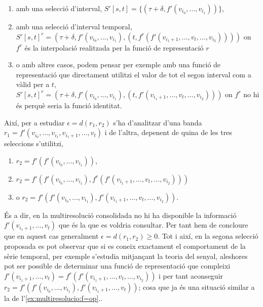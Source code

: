   \begin{enumerate}
  \item amb una selecció d'interval,  $S'[s,t]=\{ (\tau+\delta,
    f'(v_{i_0},\dotsc,v_{i_1}) ) \}$,

  \item amb una selecció d'interval temporal,
    $S'[s,t]^r=(\tau+\delta, f'(v_{i_0},\dotsc,v_{i_1}), (t,
    f^r(f'(v_{i_1+1},\dotsc,v_{t} ,\dotsc,v_{i_2}))) ) $ on $f^r$ és
    la interpolació realitzada per la funció de representació $r$

  \item o amb altres casos, podem pensar per exemple amb una funció de
    representació que directament utilitzi el valor de tot el segon
    interval com a vàlid per a $t$, $S'[s,t]^r=(\tau+\delta,
    f'(v_{i_0},\dotsc,v_{i_1}), (t, f'(v_{i_1+1},\dotsc,v_{t}
    ,\dotsc,v_{i_2})) )$ on $f^r$ no hi és perquè seria la funció identitat.
   \end{enumerate}



   Així, per a estudiar $\epsilon=d(r_1,r_2)$ s'ha d'analitzar d'una
   banda $r_1=f'(v_{i_0},\dotsc,v_{i_1},v_{i_1+1},\dotsc,v_{t})$ i de l'altra, depenent de quina de les
   tres seleccions s'utilitzi,
   \begin{enumerate}
   \item $r_2=f'(f'(v_{i_0},\dotsc,v_{i_1}))$, 

   \item
     $r_2=f'(f'(v_{i_0},\dotsc,v_{i_1}),f^r(f'(v_{i_1+1},\dotsc,v_{t},\dotsc,v_{i_2})))$
     \item o $r_2=f'(f'(v_{i_0},\dotsc,v_{i_1}),f'(v_{i_1+1},\dotsc,v_{t},\dotsc,v_{i_2}))$.
\end{enumerate}

És a dir, en la multiresolució consolidada no hi ha disponible la
informació $f'(v_{i_1+1},\dotsc,v_{t})$ que és la que es voldria
consultar.  Per tant hem de concloure que en aquest cas generalment
$\epsilon=d(r_1,r_2)\geq 0$. Tot i així, en la segona selecció
proposada es pot observar que si es coneix exactament el comportament
de la sèrie temporal, per exemple s'estudia mitjançant la teoria del
senyal, aleshores pot ser possible de determinar una funció de
representació que compleixi $ f'(v_{i_1+1},\dotsc,v_{t}) =
f^r(f'(v_{i_1+1},\dotsc,v_{t},\dotsc,v_{i_2}))$ i per tant aconseguir
$r_2=f'(f'(v_{i_0},\dotsc,v_{i_1}), f'(v_{i_1+1},\dotsc,v_{t}) )$;
cosa que ja és una situació similar a la de
l'\autoref{ex:multiresolucio:f=op}..







